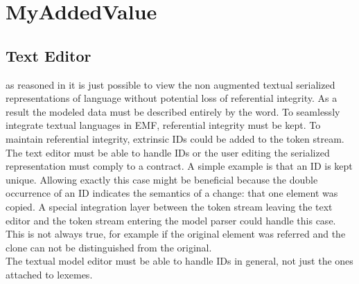 \chapter{MyAddedValue}

\section{Text Editor}
as reasoned in  it is just possible to view the non augmented textual serialized representations of language without potential loss of referential integrity. As a result the modeled data must be described entirely by the word. To seamlessly integrate textual languages in EMF, referential integrity must be kept. To maintain referential integrity, extrinsic IDs could be added  to the token stream. The text editor must be able to handle IDs or the user editing the serialized representation must comply to a contract. A simple example is that an ID is kept unique. Allowing exactly this case might be beneficial because the double occurrence  of an ID indicates the semantics of a change: that one element was copied. A special integration layer between the token stream leaving the text editor and the token stream entering the model parser could handle this case. This is not always true, for example if the original element was referred and the clone can not be distinguished from the original. \\
The textual model editor must be able to handle IDs in general, not just the ones attached to lexemes. 





